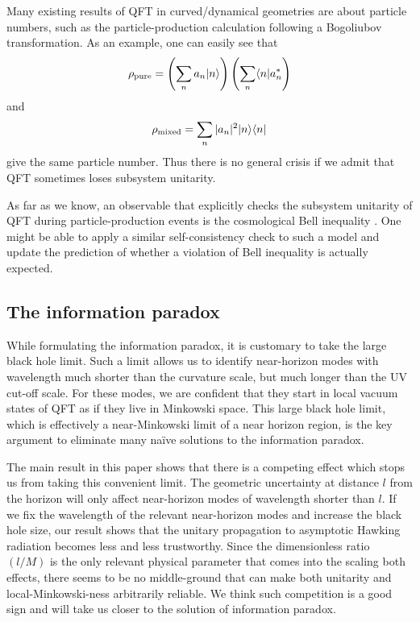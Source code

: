 \documentclass[aps,showpacs,onecolumn,floats,prd,superscriptaddress,nofootinbib]{revtex4-1}
\begin{document}
Many existing results of QFT in curved/dynamical geometries are about particle numbers, such as the particle-production calculation following a Bogoliubov transformation. 
As an example, one can easily see that
\begin{equation}
\rho_{\rm pure} = \left(\sum_n a_n|n\rangle\right)
\left(\sum_n \langle n| a_n^*\right)
\end{equation}
and
\begin{equation}
\rho_{\rm mixed} = \sum_n |a_n|^2 |n\rangle\langle n|
\end{equation}
give the same particle number. 
Thus there is no general crisis if we admit that QFT sometimes loses subsystem unitarity. 

As far as we know, an observable that explicitly checks the subsystem unitarity of QFT during particle-production events is the cosmological Bell inequality \cite{Mal15}. 
One might be able to apply a similar self-consistency check to such a model and update the prediction of whether a violation of Bell inequality is actually expected.


\subsection{The information paradox}

While formulating the information paradox, it is customary to take the large black hole limit.
Such a limit allows us to identify near-horizon modes with wavelength much shorter than the curvature scale, but much longer than the UV cut-off scale.
For these modes, we are confident that they start in local vacuum states of QFT as if they live in Minkowski space.
This large black hole limit, which is effectively a near-Minkowski limit of a near horizon region, is the key argument to eliminate many na\"ive solutions to the information paradox.

The main result in this paper shows that there is a competing effect which stops us from taking this convenient limit.
The geometric uncertainty at distance $l$ from the horizon will only affect near-horizon modes of wavelength shorter than $l$.
If we fix the wavelength of the relevant near-horizon modes and increase the black hole size, our result shows that the unitary propagation to asymptotic Hawking radiation becomes less and less trustworthy. 
Since the dimensionless ratio $(l/M)$ is the only relevant physical parameter that comes into the scaling both effects, there seems to be no middle-ground that can make both unitarity and local-Minkowski-ness arbitrarily reliable.
We think such competition is a good sign and will take us closer to the solution of information paradox.
\end{document}
